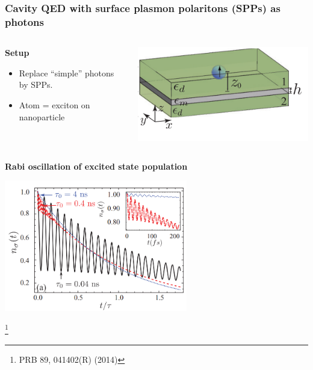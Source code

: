 \documentclass[t]{beamer}
\newcommand\blfootnote[1]{%
\begingroup
\renewcommand\thefootnote{}\footnote{#1}%
\addtocounter{footnote}{-1}%
\endgroup
}
\begin{document}
\begin{frame}
\frametitle{Cavity QED with surface
plasmon polaritons (SPPs) as photons}

\begin{columns}[T]
    \begin{column}{0.7\textwidth}
        \textbf{Setup}
        \begin{itemize}
            \item Replace ``simple'' photons by SPPs.
            \item Atom = exciton on nanoparticle
        \end{itemize}
    \end{column}
    \begin{column}{0.3\textwidth}
        \includegraphics[width=\textwidth]{figs/emitter-in-sandwich.PNG}
    \end{column}
\end{columns}

\textbf{Rabi oscillation of excited state population} 
\begin{center}
    \includegraphics[width=0.6\textwidth]{figs/emitter-plasmon.PNG}
\end{center}

\blfootnote{PRB 89, 041402(R) (2014)}

\end{frame}
\end{document}

